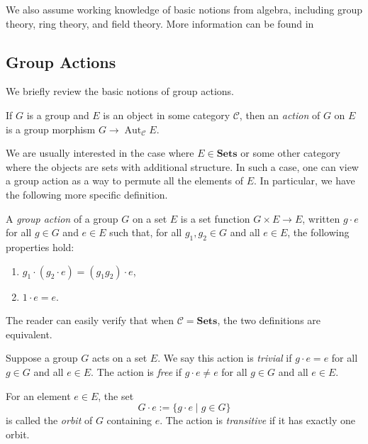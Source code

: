\documentclass[11pt,openany]{book} %
\newcommand{\Aut}{\operatorname{Aut}}
\begin{document}
We also assume working knowledge of basic notions from algebra, including group theory, ring theory, and field theory. More information can be found in \cite{dandf}

\subsection{Group Actions} \label{groupactions}
We briefly review the basic notions of group actions.\\

\begin{definition}
If $G$ is a group and $E$ is an object in some category $\mathcal{C}$, then an \emph{action} of $G$ on $E$ is a group morphism $G \to \Aut_{\mathcal{C}}E$.
\end{definition}

We are usually interested in the case where $E \in \mathbf{Sets}$ or some other category where the objects are sets with additional structure. In such a case, one can view a group action as a way to permute all the elements of $E$. In particular, we have the following more specific definition.\\

\begin{definition}
A \emph{group action} of a group $G$ on a set $E$ is a set function $G \times E \to E$, written $g \cdot e$ for all $g \in G$ and $e \in E$ such that, for all $g_1,g_2 \in G$ and all $e \in E$, the following properties hold:
\begin{enumerate}
	\item $g_1 \cdot (g_2 \cdot e) = (g_1g_2) \cdot e$,
    \item $1 \cdot e = e$.
\end{enumerate}
\end{definition}

The reader can easily verify that when $\mathcal{C} = \mathbf{Sets}$, the two definitions are equivalent.\\

\begin{definition} Suppose a group $G$ acts on a set $E$. We say this action is \emph{trivial} if $g \cdot e = e$ for all $g \in G$ and all $e \in E$. The action is \emph{free} if $g \cdot e \neq e$ for all $g \in G$ and all $e \in E$.

\medskip
For an element $e \in E$, the set 
\[G\cdot e := \{g \cdot e \mid g \in G\}\]
is called the \emph{orbit} of $G$ containing $e$. The action is \emph{transitive} if it has exactly one orbit.
\end{definition}
\end{document}
